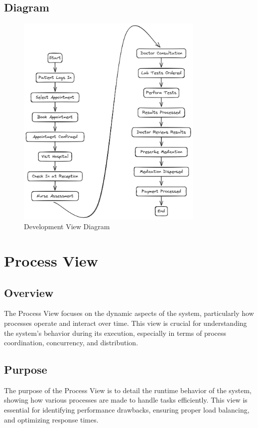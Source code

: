 \documentclass[12pt]{article}
\begin{document}
\subsection*{Diagram}
\begin{figure}[h!]
\centering
\includegraphics[width=0.8\textwidth]{activity.png}
\caption{Development View Diagram}
\end{figure}



\newpage


\section*{Process View}
\subsection*{Overview}
The Process View focuses on the dynamic aspects of the system, particularly how processes operate and interact over time. This view is crucial for understanding the system's behavior during its execution, especially in terms of process coordination, concurrency, and distribution.

\subsection*{Purpose}
The purpose of the Process View is to detail the runtime behavior of the system, showing how various processes are made to handle tasks efficiently. This view is essential for identifying performance drawbacks, ensuring proper load balancing, and optimizing response times.
\end{document}
